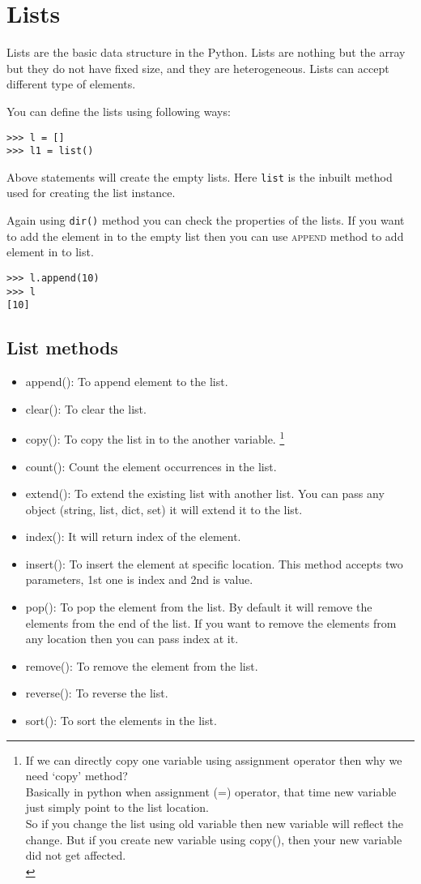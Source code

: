 \documentclass[letterpaper,12pt]{book}
\begin{document}
\section{Lists}
Lists are the basic data structure in the Python. Lists are nothing but the array but they do not have fixed size, and they are heterogeneous. Lists can accept different type of elements.

You can define the lists using following ways:
\begin{lstlisting}
>>> l = []
>>> l1 = list()
\end{lstlisting}
Above statements will create the empty lists. Here \texttt{list} is the inbuilt method used for creating the list instance.

Again using \texttt{dir()} method you can check the properties of the lists.
If you want to add the element in to the empty list then you can use \textsc{append} method to add element in to list.
\begin{lstlisting}
>>> l.append(10)
>>> l
[10]
\end{lstlisting}
\subsection{List methods}
\begin{itemize}
\item append(): To append element to the list.
\item clear(): To clear the list.
\item copy(): To copy the list in to the another variable. \footnote{ If we can directly copy one variable using assignment operator then why we need `copy' method?\\ Basically in python when assignment (=) operator, that time new variable just simply point to the list location. 
\\
So if you change the list using old variable then new variable will reflect the change. But if you create new variable using copy(), then your new variable did not get affected.\\

}

\item count(): Count the element occurrences in the list.
\item extend(): To extend the existing list with another list. You can pass any object (string, list, dict, set) it will extend it to the list. 
\item index(): It will return index of the element.
\item insert(): To insert the element at specific location. This method accepts two parameters, 1st one is index and 2nd is value.
\item pop(): To pop the element from the list. By default it will remove the elements from the end of the list. If you want to remove the elements from any location then you can pass index at it.
\item remove(): To remove the element from the list.
\item reverse(): To reverse the list.
\item sort(): To sort the elements in the list.
\end{itemize}
\clearpage
\end{document}
